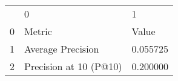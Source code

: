 \begin{tabular}{lll}
 & 0 & 1 \\
0 & Metric & Value \\
1 & Average Precision & 0.055725 \\
2 & Precision at 10 (P@10) & 0.200000 \\
\end{tabular}
